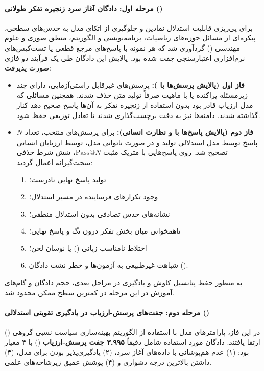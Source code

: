 \paragraph*{مرحله اول: دادگان آغاز سرد زنجیره تفکر طولانی ()}
برای پی‌ریزی قابلیت استدلال نمادین و جلوگیری از اتکای مدل به حدس‌های سطحی، پیکره‌ای از مسائل حوزه‌های ریاضیات، برنامه‌نویسی و الگوریتم، منطق صوری و علوم مهندسی () گردآوری شد که هر نمونه با پاسخ‌های مرجع قطعی یا تست‌کیس‌های نرم‌افزاری اعتبارسنجی جفت شده بود. پالایش این دادگان طی یک فرآیند دو فازی صورت پذیرفت:
\begin{itemize}
    \item \textbf{فاز اول (پالایش پرسش‌ها با ):} پرسش‌های غیرقابل راستی‌آزمایی، دارای چند زیرمسئله پراکنده یا با ماهیت صرفاً تولید متن حذف شدند. همچنین مسائلی که مدل ارزیاب قادر بود بدون استفاده از زنجیره تفکر به آن‌ها پاسخ صحیح دهد کنار گذاشته شدند. دامنه‌ها نیز به دقت برچسب‌گذاری شدند تا تعادل توزیعی حفظ شود.
    \item \textbf{فاز دوم (پالایش پاسخ‌ها با  و نظارت انسانی):} برای پرسش‌های منتخب، تعداد $N$ پاسخ توسط مدل استدلالی  \cite{qwen2025qwq} تولید و در صورت ناتوانی مدل، توسط ارزیابان انسانی تصحیح شد. روی پاسخ‌هایی با متریک مثبت $\text{Pass}@N$، شش شرط حذفی سخت‌گیرانه اعمال گردید:
    \begin{enumerate}
        \item تولید پاسخ نهایی نادرست؛
        \item وجود تکرارهای فرساینده در مسیر استدلال؛
        \item نشانه‌های حدس تصادفی بدون استدلال منطقی؛
        \item ناهمخوانی میان بخش تفکر درون تگ  و پاسخ نهایی؛
        \item اختلاط نامناسب زبانی () یا نوسان لحن؛
        \item شباهت غیرطبیعی به آزمون‌ها و خطر نشت دادگان ().
    \end{enumerate}
\end{itemize}
به منظور حفظ پتانسیل کاوش و یادگیری در مراحل بعدی، حجم دادگان و گام‌های آموزش در این مرحله در کمترین سطح ممکن محدود شد.

\paragraph*{مرحله دوم: جفت‌های پرسش-ارزیاب در یادگیری تقویتی استدلالی ()}
در این فاز، پارامترهای مدل با استفاده از الگوریتم بهینه‌سازی سیاست نسبی گروهی () \cite{shao2024deepseekmath} ارتقا یافتند. دادگان مورد استفاده شامل دقیقاً \textbf{۳,۹۹۵ جفت پرسش-ارزیاب} () با ۴ معیار بود: (۱) عدم هم‌پوشانی با داده‌های آغاز سرد، (۲) یادگیری‌پذیر بودن برای مدل، (۳) داشتن بالاترین درجه دشواری و (۴) پوشش عمیق زیرشاخه‌های علمی.


